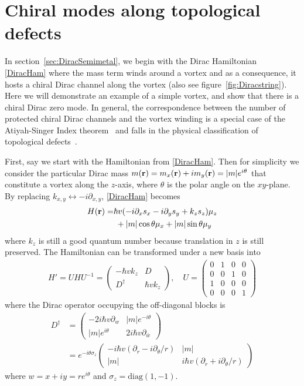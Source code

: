 \chapter{Chiral modes along topological defects}\label{sec:chiralmodesapp}
In section~\ref{sec:DiracSemimetal}, we begin with the Dirac Hamiltonian \eqref{DiracHam} where the mass term winds around a vortex and as a consequence, it hosts a chiral Dirac channel along the vortex (also see figure~\ref{fig:Diracstring}). Here we will demonstrate an example of a simple vortex, and show that there is a chiral Dirac zero mode. In general, the correspondence between the number of protected chiral Dirac channels and the vortex winding is a special case of the Atiyah-Singer Index theorem~\cite{AtiyahSinger63} and falls in the physical classification of topological defects~\cite{TeoKane}.

First, say we start with the Hamiltonian from \eqref{DiracHam}. Then for simplicity we consider the particular Dirac mass $m({\bf r})=m_x({\bf r})+im_y({\bf r})=|m|e^{i\theta}$ that constitute a vortex along the $z$-axis, where $\theta$ is the polar angle on the $xy$-plane. By replacing $k_{x,y}\leftrightarrow-i\partial_{x,y}$, \eqref{DiracHam} becomes \begin{align}H({\bf r})=&\hbar v(-i\partial_xs_x-i\partial_ys_y+k_zs_z)\mu_z\nonumber\\&\;+|m|\cos\theta\mu_x+|m|\sin\theta\mu_y\label{DiracHamapp}\end{align} where $k_z$ is still a good quantum number because translation in $z$ is still preserved. The Hamiltonian can be transformed under a new basis into \begin{align}H'=UHU^{-1}=\left(\begin{smallmatrix}-\hbar vk_z&D\\D^\dagger&\hbar vk_z\end{smallmatrix}\right),\quad U =\left(\begin{smallmatrix}0&1&0&0\\0&0&1&0\\1&0&0&0\\0&0&0&1\end{smallmatrix}\right)\end{align} where the Dirac operator occupying the off-diagonal blocks is \begin{align}D^\dagger &=\left(\begin{smallmatrix}-2i\hbar v\partial_w&|m|e^{-i\theta}\\|m|e^{i\theta}&2i\hbar v \partial_{\bar{w}}\end{smallmatrix}\right)\nonumber\\&=e^{-i\theta\sigma_z}\left(\begin{smallmatrix}-i\hbar v(\partial_r-i \partial_\theta/r)&|m|\\|m|&i\hbar v(\partial_r+i\partial_\theta/r)\end{smallmatrix}\right)\end{align} where $w=x+iy=re^{i\theta}$ and $\sigma_z=\mathrm{diag}(1,-1)$. 


